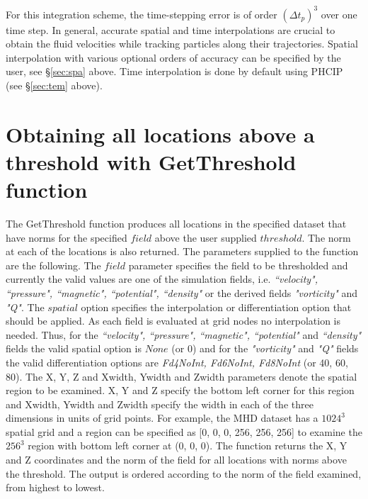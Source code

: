\documentclass[11pt]{article}
\begin{document}
For this integration scheme, the time-stepping error is of order $(\Delta t_p)^3$ over one time step. In general, accurate spatial and time interpolations are crucial to obtain the fluid velocities while tracking particles along their trajectories. Spatial interpolation with various optional orders of accuracy can be specified by the user, see \S\ref{sec:spa}  above. Time interpolation is done by default using PHCIP (see \S\ref{sec:tem} above).


\section{Obtaining all locations above a threshold with GetThreshold function}

The GetThreshold function produces all locations in the specified dataset that have norms for the specified $field$ above the user supplied $threshold$. 
The norm at each of the locations is also returned. The parameters supplied to the function are the following. The $field$ parameter specifies the field to be
thresholded and currently the valid values are one of the simulation fields, i.e. \emph{``velocity", ``pressure", ``magnetic", ``potential", ``density"} or
the derived fields \emph{"vorticity"} and \emph{"Q"}. The $spatial$ option specifies the interpolation or differentiation option that should be applied. 
As each field is evaluated at grid nodes no interpolation is needed. Thus, for
the \emph{``velocity", ``pressure", ``magnetic", ``potential"} and \emph{``density"} fields the valid spatial option is $None$ (or 0) and for the \emph{"vorticity"} and \emph{"Q"} fields the valid differentiation options are \emph{Fd4NoInt, Fd6NoInt, Fd8NoInt} (or 40, 60, 80).
The X, Y, Z and Xwidth, Ywidth and Zwidth parameters denote the spatial region to be examined. X, Y and Z specify
the bottom left corner for this region and Xwidth, Ywidth and Zwidth specify the width in each of the three dimensions in units of grid points. For example, 
the MHD dataset has a $1024^3$ spatial grid and a region can be specified as [0, 0, 0, 256, 256, 256] to examine the $256^3$ region with bottom left corner at
(0, 0, 0). The function returns the X, Y and Z coordinates and the norm of the field for all locations with norms above the threshold.
The output is ordered according to the norm of the field examined, from highest to lowest.



\end{document}
